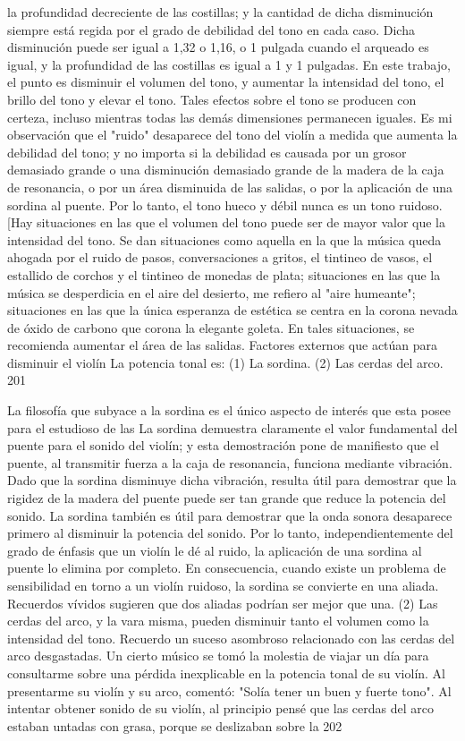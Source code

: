 la profundidad decreciente de las costillas; y la cantidad de dicha disminución siempre está regida por el grado de debilidad del tono en cada caso. Dicha disminución puede ser igual a 1,32 o 1,16, o 1 pulgada cuando el arqueado es igual, y la profundidad de las costillas es igual a 1 y 1 pulgadas. En este trabajo, el punto es disminuir el volumen del tono, y aumentar la intensidad del tono, el brillo del tono y elevar el tono. Tales efectos sobre el tono se producen con certeza, incluso mientras todas las demás dimensiones permanecen iguales. Es mi observación que el "ruido" desaparece del tono del violín a medida que aumenta la debilidad del tono; y no importa si la debilidad es causada por un grosor demasiado grande o una disminución demasiado grande de la madera de la caja de resonancia, o por un área disminuida de las salidas, o por la aplicación de una sordina al puente. Por lo tanto, el tono hueco y débil nunca es un tono ruidoso. [Hay situaciones en las que el volumen del tono puede ser de mayor valor que la intensidad del tono. Se dan situaciones como aquella en la que la música queda ahogada por el ruido de pasos, conversaciones a gritos, el tintineo de vasos, el estallido de corchos y el tintineo de monedas de plata; situaciones en las que la música se desperdicia en el aire del desierto, me refiero al "aire humeante"; situaciones en las que la única esperanza de estética se centra en la corona nevada de óxido de carbono que corona la elegante goleta. En tales situaciones, se recomienda aumentar el área de las salidas.
Factores externos que actúan para disminuir el violín
La potencia tonal es: (1) La sordina. (2) Las cerdas del arco. 201

La filosofía que subyace a la sordina es el único aspecto de interés que esta posee para el estudioso de las  La sordina demuestra claramente el valor fundamental del puente para el sonido del violín; y esta demostración pone de manifiesto que el puente, al transmitir fuerza a la caja de resonancia, funciona mediante vibración. Dado que la sordina disminuye dicha vibración, resulta útil para demostrar que la rigidez de la madera del puente puede ser tan grande que reduce la potencia del sonido. La sordina también es útil para demostrar que la onda sonora desaparece primero al disminuir la potencia del sonido. Por lo tanto, independientemente del grado de énfasis que un violín le dé al ruido, la aplicación de una sordina al puente lo elimina por completo. En consecuencia, cuando existe un problema de sensibilidad en torno a un violín ruidoso, la sordina se convierte en una aliada. Recuerdos vívidos sugieren que dos aliadas podrían ser mejor que una.
(2) Las cerdas del arco, y la vara misma, pueden disminuir tanto el volumen como la intensidad del tono. Recuerdo un suceso asombroso relacionado con las cerdas del arco desgastadas. Un cierto músico se tomó la molestia de viajar un día para consultarme sobre una pérdida inexplicable en la potencia tonal de su violín. Al presentarme su violín y su arco, comentó: "Solía tener un buen y fuerte tono". Al intentar obtener sonido de su violín, al principio pensé que las cerdas del arco estaban untadas con grasa, porque se deslizaban sobre la
202

